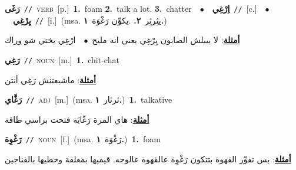 \documentclass[10pt,a4paper,twoside]{article} %
\begin{document}
\begin{multicols}{2}
{\setlength\topsep{0pt}\textbf{\foreignlanguage{arabic}{رَغَى}}\ {\color{gray}\texttt{//}\color{black}}\ \textsc{verb}\ [p.]\ \textbf{1.}~foam  \textbf{2.}~talk a lot.  \textbf{3.}~chatter\ \ $\bullet$\ \ \setlength\topsep{0pt}\textbf{\foreignlanguage{arabic}{اِرْغِي}}\ {\color{gray}\texttt{//}\color{black}}\ [c.]\ \ $\bullet$\ \ \setlength\topsep{0pt}\textbf{\foreignlanguage{arabic}{يِرْغِي}}\ {\color{gray}\texttt{//}\color{black}}\ [i.]\ \color{gray}(msa. \foreignlanguage{arabic}{يثِرثِر}~\foreignlanguage{arabic}{\textbf{٢.}}  .\foreignlanguage{arabic}{يكوِّن رَغْوَة}~\foreignlanguage{arabic}{\textbf{١.}})\color{black}\  \begin{flushright}\color{gray}\foreignlanguage{arabic}{\textbf{\underline{\foreignlanguage{arabic}{أمثلة}}}: لا بيبلش الصابون يِرْغِي يعني انه مليح\ $\bullet$\ \  ارْغِي يختي شو وراك}\end{flushright}\color{black}} \vspace{2mm}

{\setlength\topsep{0pt}\textbf{\foreignlanguage{arabic}{رَغِي}}\ {\color{gray}\texttt{//}\color{black}}\ \textsc{noun}\ [m.]\ \textbf{1.}~chit-chat\  \begin{flushright}\color{gray}\foreignlanguage{arabic}{\textbf{\underline{\foreignlanguage{arabic}{أمثلة}}}: ماشبعتنش رَغِي أنتن}\end{flushright}\color{black}} \vspace{2mm}

{\setlength\topsep{0pt}\textbf{\foreignlanguage{arabic}{رَغَّاي}}\ {\color{gray}\texttt{//}\color{black}}\ \textsc{adj}\ [m.]\ \color{gray}(msa. \foreignlanguage{arabic}{ثرثار}~\foreignlanguage{arabic}{\textbf{١.}})\color{black}\ \textbf{1.}~talkative\  \begin{flushright}\color{gray}\foreignlanguage{arabic}{\textbf{\underline{\foreignlanguage{arabic}{أمثلة}}}: هاي المرة رَغّايَة فتحت براسي طاقة}\end{flushright}\color{black}} \vspace{2mm}

{\setlength\topsep{0pt}\textbf{\foreignlanguage{arabic}{رَغْوِة}}\ {\color{gray}\texttt{//}\color{black}}\ \textsc{noun}\ [f.]\ \color{gray}(msa. \foreignlanguage{arabic}{رَغْوَة}~\foreignlanguage{arabic}{\textbf{١.}})\color{black}\ \textbf{1.}~foam\  \begin{flushright}\color{gray}\foreignlanguage{arabic}{\textbf{\underline{\foreignlanguage{arabic}{أمثلة}}}: بس تفوِّر القهوة بتتكون رَغْوِة عالقهوة عالوجه. قيميها بمعلقة وحطيها بالفناجين}\end{flushright}\color{black}} \vspace{2mm}


\end{multicols}
\end{document}
